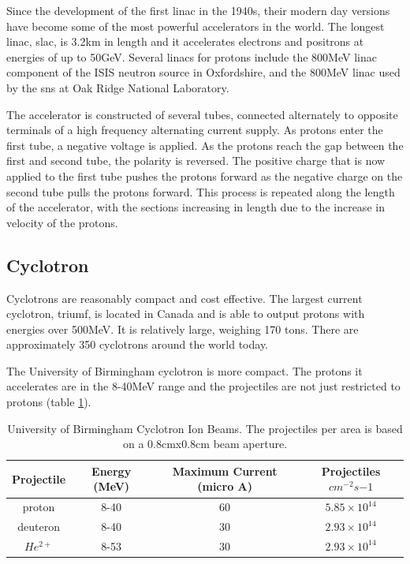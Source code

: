 Since the development of the first \acrfull{linac} in the 1940s, their modern day versions have become some of the most powerful accelerators in the world.  The longest \acrshort{linac}, \acrlong{slac}, is 3.2km in length and it accelerates electrons and positrons at energies of up to 50GeV.  Several \acrshort{linac}s for protons include the 800MeV \acrshort{linac} component of the ISIS neutron source in Oxfordshire, and the 800MeV \acrshort{linac} used by the \acrlong{sns} at Oak Ridge National Laboratory.

The accelerator is constructed of several tubes, connected alternately to opposite terminals of a high frequency alternating current supply.  As protons enter the first tube, a negative voltage is applied.  As the protons reach the gap between the first and second tube, the polarity is reversed.  The positive charge that is now applied to the first tube pushes the protons forward as the negative charge on the second tube pulls the protons forward.  This process is repeated along the length of the accelerator, with the sections increasing in length due to the increase in velocity of the protons.




\FloatBarrier
\subsection{Cyclotron}

Cyclotrons are reasonably compact and cost effective.  The largest current cyclotron, \acrlong{triumf}, is located in Canada and is able to output protons with energies over 500MeV.  It is relatively large, weighing 170 tons.  There are approximately 350 cyclotrons\cite{cyclotrons} around the world today.

The University of Birmingham cyclotron is more compact.  The protons it accelerates are in the 8-40MeV range and the projectiles are not just restricted to protons (table \ref{table:mc40projectiles}).


\begin{table}[h]
\begin{center}
\renewcommand{\arraystretch}{1.2}
\begin{tabular}{c c c c}
\hline\hline
Projectile & Energy (MeV) & Maximum Current (micro A) & Projectiles $cm^{-2} s{-1}$\\
\hline\hline 
proton & 8-40 & 60 & $5.85 \times 10^{14}$  \\
deuteron & 8-40 & 30 & $2.93 \times 10^{14}$  \\
$He^{2+}$ & 8-53 & 30 & $2.93 \times 10^{14}$ \\
\hline\hline
\end{tabular}
\end{center}
\caption{University of Birmingham Cyclotron Ion Beams.  The projectiles per area is based on a 0.8cmx0.8cm beam aperture.}
\label{table:mc40projectiles}
\end{table}

